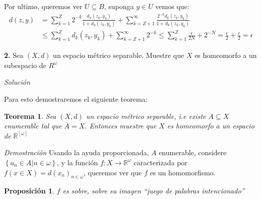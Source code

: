 \documentclass[]{article}
\newtheorem{thm}{Teorema}
\newtheorem{prop}{Proposición}
\newcommand{\set}[1]{\left\lbrace #1 \right\rbrace}
\newcommand{\RR}{\mathbb{R}}
\newcommand{\function}[3]{#1 : #2 \rightarrow #3}
\newcommand{\contained}{\subseteq}
\begin{document}
Por ultimo, queremos ver $ U \contained B $, suponga $ y \in U $ vemos que:
\begin{align*}
d(z,y) &= \sum_{k=1}^{Z}2^{-k}\frac{d_k(z_k,y_k)}{1+d_k(z_k,y_k)} + \sum_{k = Z+1}^{\infty}\frac{2^{-k}d_k(z_k,y_k)}{1+d_k(z_k,y_k)} \\
&\leq \sum_{k =1}^{Z} d_k(z_k,y_k) + \sum_{k = Z+1}^{\infty}2^{-k} \leq \sum_{k=1}^{Z}\frac{\epsilon}{2N} + 2^{-N} = \frac{\epsilon}{2} + \frac{\epsilon}{2} = \epsilon
\end{align*}

\textbf{2.} Sea $ (X,d) $ un espacio métrico separable. Muestre que $ X $ es homeomorfo a un subespacio de $ R^{\omega} $

\emph{Solución}

Para esto demostraremos el siguiente teorema:

\begin{thm}
	Sea $ (X,d) $ un espacio métrico separable, i.e existe $ A \contained X $ enumerable tal que $ \bar{A} = X $. Entonces muestre que $ X $ es homeomorfo a un espacio de $ \RR^[\omega] $
	
\end{thm}

\textit{Demostración} Usando la ayuda proporcionada, $A$ enumerable, considere $ \set{a_n \in A | n \in \omega} $, y la función $ \function{f}{X}{\RR^{\omega}} $ caracterizada por $ f(x \in X) = d(x_n)_{n \in \omega} $, queremos ver que $f$ es un homomorfismo.

\begin{prop}
	$f$ es sobre, sobre su imagen \emph{``juego de palabras intencionado''}
\end{prop}


 
\end{document}
